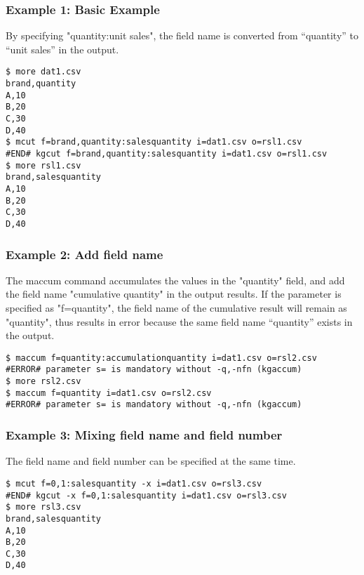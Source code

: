 \subsubsection*{Example 1: Basic Example}

By specifying "quantity:unit sales", the field name is converted from “quantity” to “unit sales” in the output.


\begin{Verbatim}[baselinestretch=0.7,frame=single]
$ more dat1.csv
brand,quantity
A,10
B,20
C,30
D,40
$ mcut f=brand,quantity:salesquantity i=dat1.csv o=rsl1.csv
#END# kgcut f=brand,quantity:salesquantity i=dat1.csv o=rsl1.csv
$ more rsl1.csv
brand,salesquantity
A,10
B,20
C,30
D,40
\end{Verbatim}
\subsubsection*{Example 2: Add field name}

The maccum command accumulates the values in the "quantity" field, and add the field name "cumulative quantity" in the output results. If the parameter is specified as "f=quantity", the field name of the cumulative result will remain as "quantity", thus results in error because the same field name “quantity” exists in the output. 


\begin{Verbatim}[baselinestretch=0.7,frame=single]
$ maccum f=quantity:accumulationquantity i=dat1.csv o=rsl2.csv
#ERROR# parameter s= is mandatory without -q,-nfn (kgaccum)
$ more rsl2.csv
$ maccum f=quantity i=dat1.csv o=rsl2.csv
#ERROR# parameter s= is mandatory without -q,-nfn (kgaccum)
\end{Verbatim}
\subsubsection*{Example 3: Mixing field name and field number}

The field name and field number can be specified at the same time.


\begin{Verbatim}[baselinestretch=0.7,frame=single]
$ mcut f=0,1:salesquantity -x i=dat1.csv o=rsl3.csv
#END# kgcut -x f=0,1:salesquantity i=dat1.csv o=rsl3.csv
$ more rsl3.csv
brand,salesquantity
A,10
B,20
C,30
D,40
\end{Verbatim}

